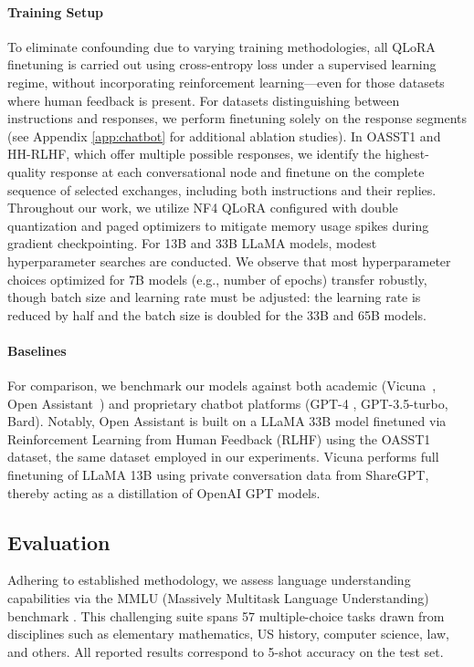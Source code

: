 \paragraph{Training Setup} To eliminate confounding due to varying training methodologies, all QLoRA finetuning is carried out using cross-entropy loss under a supervised learning regime, without incorporating reinforcement learning—even for those datasets where human feedback is present. For datasets distinguishing between instructions and responses, we perform finetuning solely on the response segments (see Appendix \ref{app:chatbot} for additional ablation studies). In OASST1 and HH-RLHF, which offer multiple possible responses, we identify the highest-quality response at each conversational node and finetune on the complete sequence of selected exchanges, including both instructions and their replies. Throughout our work, we utilize NF4 \textsc{QLoRA} configured with double quantization and paged optimizers to mitigate memory usage spikes during gradient checkpointing. For 13B and 33B LLaMA models, modest hyperparameter searches are conducted. We observe that most hyperparameter choices optimized for 7B models (e.g., number of epochs) transfer robustly, though batch size and learning rate must be adjusted: the learning rate is reduced by half and the batch size is doubled for the 33B and 65B models.

\paragraph{Baselines} For comparison, we benchmark our models against both academic (Vicuna~\citep{vicuna2023}, Open Assistant~\citep{kopf2023openassistant}) and proprietary chatbot platforms (GPT-4 \citep{openai2023gpt}, GPT-3.5-turbo, Bard). Notably, Open Assistant is built on a LLaMA 33B model finetuned via Reinforcement Learning from Human Feedback (RLHF) using the OASST1 dataset, the same dataset employed in our experiments. Vicuna performs full finetuning of LLaMA 13B using private conversation data from ShareGPT, thereby acting as a distillation of OpenAI GPT models.

\subsection{Evaluation}

Adhering to established methodology, we assess language understanding capabilities via the MMLU (Massively Multitask Language Understanding) benchmark \citep{hendrycksmeasuring}. This challenging suite spans 57 multiple-choice tasks drawn from disciplines such as elementary mathematics, US history, computer science, law, and others. All reported results correspond to 5-shot accuracy on the test set.


